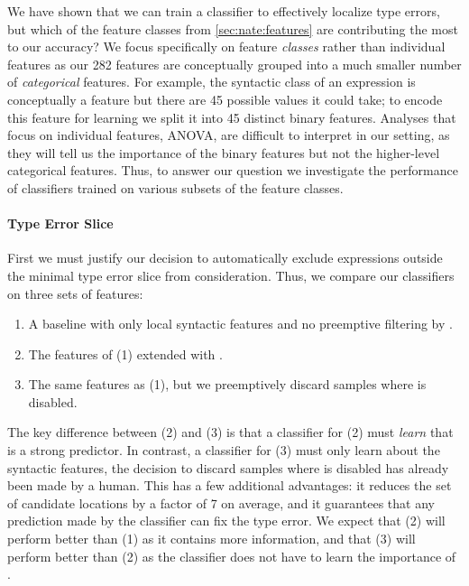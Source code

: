 \label{sec:nate:feature-utility}
We have shown that we can train a classifier to effectively localize
type errors, but which of the feature classes from
\autoref{sec:nate:features} are contributing the most to our accuracy?
%
We focus specifically on feature \emph{classes} rather than individual
features as our 282 features are conceptually grouped into a much
smaller number of \emph{categorical} features.
%
For example, the syntactic class of an expression is conceptually a
feature but there are 45 possible values it could take; to encode this
feature for learning we split it into 45 distinct binary features.
%
Analyses that focus on individual features, \eg \textsc{ANOVA},
are difficult to interpret in our setting, as they will tell us the
importance of the binary features but not the higher-level categorical
features.
%
Thus, to answer our question we investigate the performance of
classifiers trained on various subsets of the feature classes.

\paragraph{Type Error Slice}
\label{sec:nate:type-error-slice}
First we must justify our decision to automatically exclude expressions
outside the minimal type error slice from consideration.
%
%
Thus, we compare our classifiers on three sets of features:
%
\begin{enumerate}
\item A baseline with only local syntactic features and no
  preemptive filtering by \InSlice.
\item The features of (1) extended with \InSlice.
\item The same features as (1), but we preemptively discard samples
  where \InSlice is disabled.
\end{enumerate}
%
The key difference between (2) and (3) is that a classifier for (2) must
\emph{learn} that \InSlice is a strong predictor.
%
In contrast, a classifier for (3) must only learn about the syntactic
features, the decision to discard samples where \InSlice is disabled has
already been made by a human.
%
This has a few additional advantages: it reduces the set of candidate
locations by a factor of 7 on average, and it guarantees that any
prediction made by the classifier can fix the type error.
%
We expect that (2) will perform better than (1) as it contains more
information, and that (3) will perform better than (2) as the classifier
does not have to learn the importance of \InSlice.

